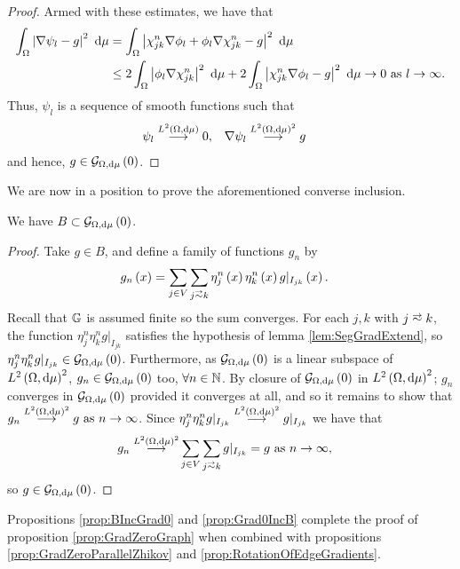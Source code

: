 \begin{proof}
	Armed with these estimates, we have that
	\begin{align*}
		\int_{\Omega}\left\lvert \nabla\psi_l - g \right\rvert^2 \ \mathrm{d}\mu 
		&= \int_{\Omega}\left\lvert \chi_{jk}^n\nabla\phi_l + \phi_l\nabla\chi_{jk}^n - g \right\rvert^2 \ \mathrm{d}\mu \\
		&\leq 2\int_{\Omega}\left\lvert \phi_l\nabla\chi_{jk}^n \right\rvert^2 \ \mathrm{d}\mu + 2\int_{\Omega}\left\lvert \chi_{jk}^n\nabla\phi_l - g \right\rvert^2 \ \mathrm{d}\mu
		\rightarrow0 \ \text{as} \ l \rightarrow\infty.
	\end{align*}
	Thus, $\psi_l$ is a sequence of smooth functions such that
	\begin{align*}
		\psi_l \overset{L^{2}\left( \Omega,\mathrm{d}\mu \right)}{\longrightarrow} 0, &\quad
		\nabla\psi_l \overset{L^{2}\left( \Omega,\mathrm{d}\mu \right)^2}{\longrightarrow} g
	\end{align*}
	and hence, $g\in\mathcal{G}_{ \Omega, \mathrm{d}\mu}\left( 0 \right)$.
\end{proof}

We are now in a position to prove the aforementioned converse inclusion.
\begin{prop} \label{prop:BIncGrad0}
	We have $B \subset \mathcal{G}_{ \Omega, \mathrm{d}\mu}\left( 0 \right)$.
\end{prop}
\begin{proof}
	Take $g\in B$, and define a family of functions $g_n$ by
	\begin{align*}
		g_n\bracs{x} &= \sum_{j\in V}\sum_{j\conLeft k}\eta_j^n\bracs{x}\eta_k^n\bracs{x}g\vert_{I_{jk}}\bracs{x}.
	\end{align*}
	Recall that $\mathbb{G}$ is assumed finite so the sum converges.
	For each $j,k$ with $j\conLeft k$, the function $\eta_j^n\eta_k^n g\vert_{I_{jk}}$ satisfies the hypothesis of lemma \ref{lem:SegGradExtend}, so $\eta_j^n\eta_k^n g\vert_{I_{jk}}\in\mathcal{G}_{ \Omega, \mathrm{d}\mu}\left( 0 \right)$.
	Furthermore, as $\mathcal{G}_{ \Omega, \mathrm{d}\mu}\left( 0 \right)$ is a linear subspace of $L^{2}\left( \Omega,\mathrm{d}\mu \right)^{2}$, $g_n\in\mathcal{G}_{ \Omega, \mathrm{d}\mu}\left( 0 \right)$ too, $\forall n\in\mathbb{N}$.
	By closure of $\mathcal{G}_{ \Omega, \mathrm{d}\mu}\left( 0 \right)$ in $L^{2}\left( \Omega,\mathrm{d}\mu \right)^2$; $g_n$ converges in $\mathcal{G}_{ \Omega, \mathrm{d}\mu}\left( 0 \right)$ provided it converges at all, and so it remains to show that $g_n\overset{L^{2}\left( \Omega,\mathrm{d}\mu \right)^2}{\longrightarrow} g \ \text{as} \ n \rightarrow\infty$.
	Since $\eta_j^n\eta_k^n g\vert_{I_{jk}}\overset{L^{2}\left( \Omega,\mathrm{d}\mu \right)^2}{\longrightarrow} g\vert_{I_{jk}}$ we have that
	\begin{align*}
		g_n \lconv{\ltwo{\ddom}{\ddmes}^2} &\sum_{j\in V}\sum_{j\conLeft k}g\vert_{I_{jk}} = g \toInfty{n},
	\end{align*}
	so $g\in\mathcal{G}_{ \Omega, \mathrm{d}\mu}\left( 0 \right)$.
\end{proof}
Propositions \ref{prop:BIncGrad0} and \ref{prop:Grad0IncB} complete the proof of proposition \ref{prop:GradZeroGraph} when combined with propositions \ref{prop:GradZeroParallelZhikov} and  \ref{prop:RotationOfEdgeGradients}.

